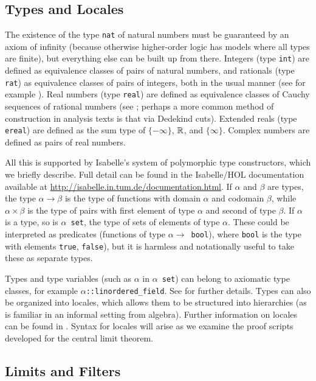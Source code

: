 \documentclass[leqno]{article}
\theoremstyle{definition}
\begin{document}
\subsection{Types and Locales} \label{sec:loc}

The existence of the type \texttt{nat} of natural numbers must be guaranteed by an axiom of infinity (because otherwise higher-order logic has models where all types are finite), but everything else can be built up from there. Integers (type \texttt{int}) are defined as equivalence classes of pairs of natural numbers, and rationals (type \texttt{rat}) as equivalence classes of pairs of integers, both in the usual manner (see for example \cite{enderton}). Real numbers (type \texttt{real}) are defined as equivalence classes of Cauchy sequences of rational numbers (see \cite{suppes}; perhaps a more common method of construction in analysis texts is that via Dedekind cuts). Extended reals (type \texttt{ereal}) are defined as the sum type of $\{-\infty\}$, $\mathbb{R}$, and $\{\infty\}$. Complex numbers are defined as pairs of real numbers.

All this is supported by Isabelle's system of polymorphic type constructors, which we briefly describe. Full detail can be found in the Isabelle/HOL documentation available at \url{http://isabelle.in.tum.de/documentation.html}. If $\alpha$ and $\beta$ are types, the type $\alpha \rightarrow \beta$ is the type of functions with domain $\alpha$ and codomain $\beta$, while $\alpha \times \beta$ is the type of pairs with first element of type $\alpha$ and second of type $\beta$. If $\alpha$ is a type, so is \texttt{$\alpha$ set}, the type of sets of elements of type $\alpha$. These could be interpreted as predicates (functions of type \texttt{$\alpha \rightarrow$ bool}), where \texttt{bool} is the type with elements \texttt{true}, \texttt{false}), but it is harmless and notationally useful to take these as separate types.

Types and type variables (such as $\alpha$ in \texttt{$\alpha$ set}) can belong to axiomatic type classes, for example \texttt{$\alpha$::linordered\_field}. See \cite{haftmann} for further details. Types can also be organized into locales, which allows them to be structured into hierarchies (as is familiar in an informal setting from algebra). Further information on locales can be found in \cite{ballarin}. Syntax for locales will arise as we examine the proof scripts developed for the central limit theorem.

\subsection{Limits and Filters} \label{sec:filterlim}
\end{document}
